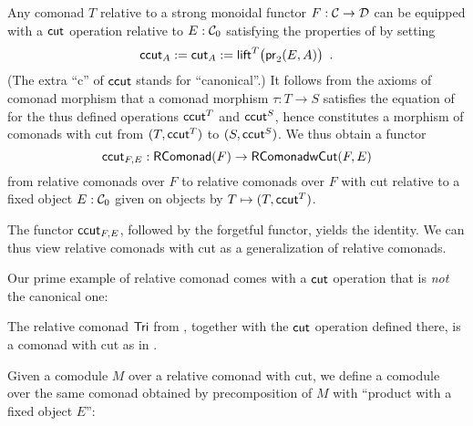 \documentclass[conference,10pt]{IEEEtran}
\begin{document}
\begin{remark}\label{canonical_cut}
 Any comonad $T$ relative to a strong monoidal functor $F:{\mathcal{C}}\to\mathcal{D}$  can be equipped with a $\mathsf{cut}$ operation relative to 
 $E:{\mathcal{C}}_0$ satisfying the properties of  by setting
   \[ \mathsf{ccut}_A := \mathsf{cut}_A := \mathsf{lift}^T\bigl(\mathsf{pr}_2(E,A)\bigr) \enspace . \]
 (The extra \enquote{c} of $\mathsf{ccut}$ stands for \enquote{canonical}.)
 It follows from the axioms of comonad morphism that a comonad morphism $\tau : T\to S$ satisfies the equation of  
 for the thus defined operations $\mathsf{ccut}^T$ and $\mathsf{ccut}^S$, hence constitutes a morphism of comonads with cut from $(T,\mathsf{ccut}^T)$ to $(S,\mathsf{ccut}^S)$.
 We thus obtain a functor 
 \[ \mathsf{ccut}_{F,E} : \mathsf{RComonad}(F) \to \mathsf{\mathsf{RComonad} wCut}(F,E)\]
 from relative comonads over $F$ to relative comonads over $F$ with cut relative to a fixed object $E:{\mathcal{C}}_0$ given on 
 objects by $T\mapsto (T,\mathsf{ccut}^T)$.
\end{remark}

The functor $\mathsf{ccut}_{F,E}$, followed by the forgetful functor, yields the identity. We can thus view
relative comonads with cut as a generalization of relative comonads.


Our prime example of relative comonad comes with a $\mathsf{cut}$ operation that is \emph{not} the canonical one:

\begin{example}\label{def:cut_for_tri}
  The relative comonad $\mathsf{Tri}$ from , together with the $\mathsf{cut}$ operation defined there, 
  is a comonad with cut as in .
\end{example}





Given a comodule $M$ over a relative comonad with cut, we define a comodule over the same comonad obtained by precomposition of $M$ with
\enquote{product with a fixed object $E$}:
\end{document}

